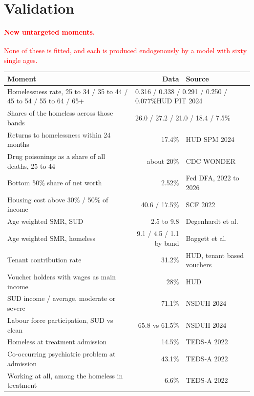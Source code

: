 \documentclass[11pt]{article}
\newcommand{\nw}[1]{\textcolor{red}{#1}}
\begin{document}
\section{Validation}
\label{sec:valid}

\nw{\paragraph{New untargeted moments.} None of these is fitted, and each is
produced endogenously by a model with sixty single ages.}

{\color{red}\begin{center}\begin{tabular}{lrl}
\toprule
Moment & Data & Source\\
\midrule
Homelessness rate, 25 to 34 / 35 to 44 / 45 to 54 / 55 to 64 / 65+ &
\multicolumn{2}{l}{0.316 / 0.338 / 0.291 / 0.250 / 0.077\%\quad HUD PIT 2024}\\
Shares of the homeless across those bands &
\multicolumn{2}{l}{26.0 / 27.2 / 21.0 / 18.4 / 7.5\%}\\
Returns to homelessness within 24 months & 17.4\% & HUD SPM 2024\\
Drug poisonings as a share of all deaths, 25 to 44 & about 20\% & CDC WONDER\\
Bottom 50\% share of net worth & 2.52\% & Fed DFA, 2022 to 2026\\
Housing cost above 30\% / 50\% of income & 40.6 / 17.5\% & SCF 2022\\
Age weighted SMR, SUD & 2.5 to 9.8 & Degenhardt et al.\\
Age weighted SMR, homeless & 9.1 / 4.5 / 1.1 by band & Baggett et al.\\
Tenant contribution rate & 31.2\% & HUD, tenant based vouchers\\
Voucher holders with wages as main income & 28\% & HUD\\
SUD income / average, moderate or severe & 71.1\% & NSDUH 2024\\
Labour force participation, SUD vs clean & 65.8 vs 61.5\% & NSDUH 2024\\
Homeless at treatment admission & 14.5\% & TEDS-A 2022\\
Co-occurring psychiatric problem at admission & 43.1\% & TEDS-A 2022\\
Working at all, among the homeless in treatment & 6.6\% & TEDS-A 2022\\
\bottomrule
\end{tabular}\end{center}}
\end{document}
